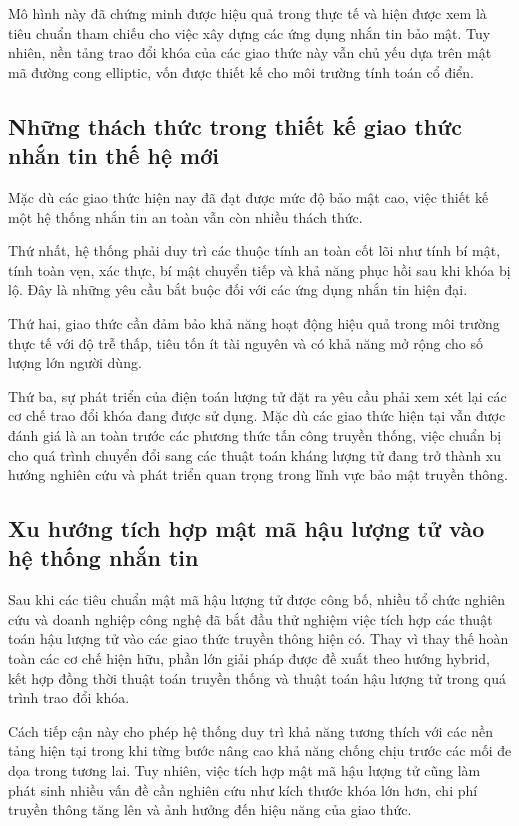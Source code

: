 Mô hình này đã chứng minh được hiệu quả trong thực tế và hiện được xem là tiêu chuẩn tham chiếu cho việc xây dựng các ứng dụng nhắn tin bảo mật. Tuy nhiên, nền tảng trao đổi khóa của các giao thức này vẫn chủ yếu dựa trên mật mã đường cong elliptic, vốn được thiết kế cho môi trường tính toán cổ điển.

\subsection{Những thách thức trong thiết kế giao thức nhắn tin thế hệ mới}

Mặc dù các giao thức hiện nay đã đạt được mức độ bảo mật cao, việc thiết kế một hệ thống nhắn tin an toàn vẫn còn nhiều thách thức.

Thứ nhất, hệ thống phải duy trì các thuộc tính an toàn cốt lõi như tính bí mật, tính toàn vẹn, xác thực, bí mật chuyển tiếp và khả năng phục hồi sau khi khóa bị lộ. Đây là những yêu cầu bắt buộc đối với các ứng dụng nhắn tin hiện đại.

Thứ hai, giao thức cần đảm bảo khả năng hoạt động hiệu quả trong môi trường thực tế với độ trễ thấp, tiêu tốn ít tài nguyên và có khả năng mở rộng cho số lượng lớn người dùng.

Thứ ba, sự phát triển của điện toán lượng tử đặt ra yêu cầu phải xem xét lại các cơ chế trao đổi khóa đang được sử dụng. Mặc dù các giao thức hiện tại vẫn được đánh giá là an toàn trước các phương thức tấn công truyền thống, việc chuẩn bị cho quá trình chuyển đổi sang các thuật toán kháng lượng tử đang trở thành xu hướng nghiên cứu và phát triển quan trọng trong lĩnh vực bảo mật truyền thông.

\subsection{Xu hướng tích hợp mật mã hậu lượng tử vào hệ thống nhắn tin}

Sau khi các tiêu chuẩn mật mã hậu lượng tử được công bố, nhiều tổ chức nghiên cứu và doanh nghiệp công nghệ đã bắt đầu thử nghiệm việc tích hợp các thuật toán hậu lượng tử vào các giao thức truyền thông hiện có. Thay vì thay thế hoàn toàn các cơ chế hiện hữu, phần lớn giải pháp được đề xuất theo hướng hybrid, kết hợp đồng thời thuật toán truyền thống và thuật toán hậu lượng tử trong quá trình trao đổi khóa.

Cách tiếp cận này cho phép hệ thống duy trì khả năng tương thích với các nền tảng hiện tại trong khi từng bước nâng cao khả năng chống chịu trước các mối đe dọa trong tương lai. Tuy nhiên, việc tích hợp mật mã hậu lượng tử cũng làm phát sinh nhiều vấn đề cần nghiên cứu như kích thước khóa lớn hơn, chi phí truyền thông tăng lên và ảnh hưởng đến hiệu năng của giao thức.

